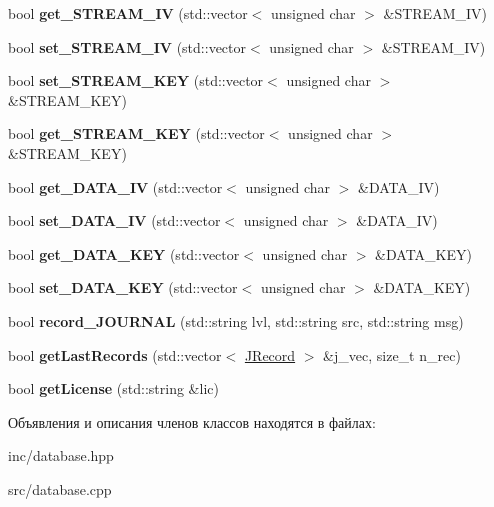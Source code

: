 \begin{DoxyCompactItemize}
\mbox{\label{classDataBase_a0fea8ffb845c2dca4c9a15fd1f1dffe7}} 
bool {\bfseries get\+\_\+\+S\+T\+R\+E\+A\+M\+\_\+\+IV} (std\+::vector$<$ unsigned char $>$ \&S\+T\+R\+E\+A\+M\+\_\+\+IV)
\item 
\mbox{\label{classDataBase_ab81fcaa52ac107608ad273b5f4f1e134}} 
bool {\bfseries set\+\_\+\+S\+T\+R\+E\+A\+M\+\_\+\+IV} (std\+::vector$<$ unsigned char $>$ \&S\+T\+R\+E\+A\+M\+\_\+\+IV)
\item 
\mbox{\label{classDataBase_a09f56a22a3a3a78aa99f087886f37958}} 
bool {\bfseries set\+\_\+\+S\+T\+R\+E\+A\+M\+\_\+\+K\+EY} (std\+::vector$<$ unsigned char $>$ \&S\+T\+R\+E\+A\+M\+\_\+\+K\+EY)
\item 
\mbox{\label{classDataBase_acbd5cdc9e119fde23f47c9addacab5a7}} 
bool {\bfseries get\+\_\+\+S\+T\+R\+E\+A\+M\+\_\+\+K\+EY} (std\+::vector$<$ unsigned char $>$ \&S\+T\+R\+E\+A\+M\+\_\+\+K\+EY)
\item 
\mbox{\label{classDataBase_a0c2cb1c3329c95003ff60a37882726d4}} 
bool {\bfseries get\+\_\+\+D\+A\+T\+A\+\_\+\+IV} (std\+::vector$<$ unsigned char $>$ \&D\+A\+T\+A\+\_\+\+IV)
\item 
\mbox{\label{classDataBase_a71989aa9daba5279122e7f97f9a64b75}} 
bool {\bfseries set\+\_\+\+D\+A\+T\+A\+\_\+\+IV} (std\+::vector$<$ unsigned char $>$ \&D\+A\+T\+A\+\_\+\+IV)
\item 
\mbox{\label{classDataBase_aebd7f93624d9f502cd832afb9620baee}} 
bool {\bfseries get\+\_\+\+D\+A\+T\+A\+\_\+\+K\+EY} (std\+::vector$<$ unsigned char $>$ \&D\+A\+T\+A\+\_\+\+K\+EY)
\item 
\mbox{\label{classDataBase_afa402c0e79d3f305eb25564a8ea402f8}} 
bool {\bfseries set\+\_\+\+D\+A\+T\+A\+\_\+\+K\+EY} (std\+::vector$<$ unsigned char $>$ \&D\+A\+T\+A\+\_\+\+K\+EY)
\item 
\mbox{\label{classDataBase_a5684c33b11f5cbe5cc396e7a813ff5c0}} 
bool {\bfseries record\+\_\+\+J\+O\+U\+R\+N\+AL} (std\+::string lvl, std\+::string src, std\+::string msg)
\item 
\mbox{\label{classDataBase_a4339acb84473940324b09ab3e65aa44e}} 
bool {\bfseries get\+Last\+Records} (std\+::vector$<$ \hyperlink{structJRecord}{J\+Record} $>$ \&j\+\_\+vec, size\+\_\+t n\+\_\+rec)
\item 
\mbox{\label{classDataBase_a9723f7db42c9bb111c5ad85c09823a89}} 
bool {\bfseries get\+License} (std\+::string \&lic)
\end{DoxyCompactItemize}


Объявления и описания членов классов находятся в файлах\+:\begin{DoxyCompactItemize}
\item 
inc/database.\+hpp\item 
src/database.\+cpp\end{DoxyCompactItemize}
